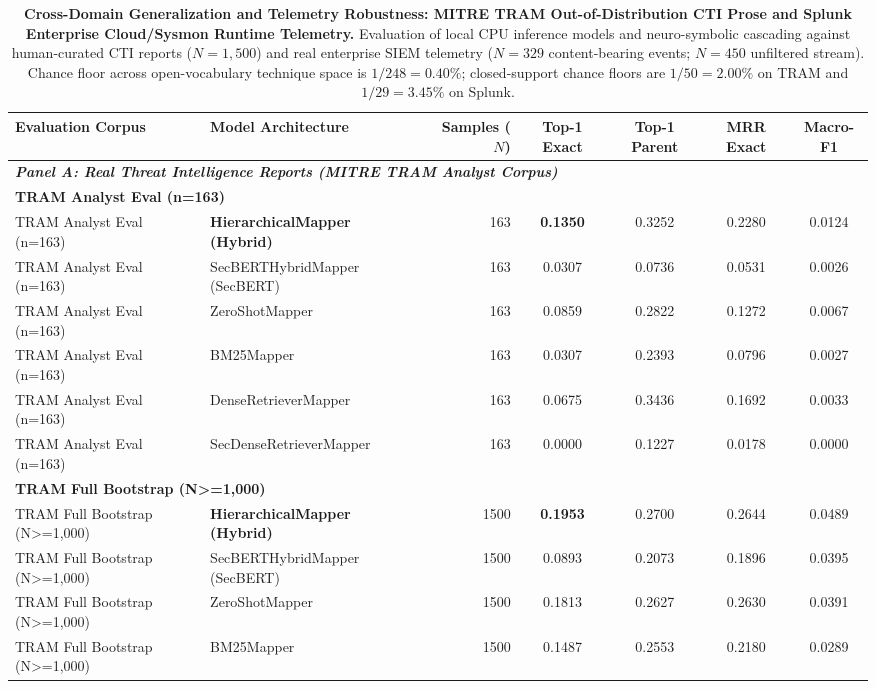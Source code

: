 \begin{table}[t]
\centering
\small
\caption{\textbf{Cross-Domain Generalization and Telemetry Robustness: MITRE TRAM Out-of-Distribution CTI Prose and Splunk Enterprise Cloud/Sysmon Runtime Telemetry.} Evaluation of local CPU inference models and neuro-symbolic cascading against human-curated CTI reports ($N=1,500$) and real enterprise SIEM telemetry ($N=329$ content-bearing events; $N=450$ unfiltered stream). Chance floor across open-vocabulary technique space is $1/248 = 0.40\%$; closed-support chance floors are $1/50 = 2.00\%$ on TRAM and $1/29 = 3.45\%$ on Splunk.}
\label{tab:external_validation}
\begin{tabular}{llrcccc}
\toprule
\textbf{Evaluation Corpus} & \textbf{Model Architecture} & \textbf{Samples ($N$)} & \textbf{Top-1 Exact} & \textbf{Top-1 Parent} & \textbf{MRR Exact} & \textbf{Macro-F1} \\
\midrule
\multicolumn{7}{l}{\textit{\textbf{Panel A: Real Threat Intelligence Reports (MITRE TRAM Analyst Corpus)}}} \\
\midrule
\multicolumn{7}{l}{\textbf{TRAM Analyst Eval (n=163)}} \\
TRAM Analyst Eval (n=163) & \textbf{HierarchicalMapper (Hybrid)} & 163 & \textbf{0.1350} & 0.3252 & 0.2280 & 0.0124 \\
TRAM Analyst Eval (n=163) & SecBERTHybridMapper (SecBERT) & 163 & 0.0307 & 0.0736 & 0.0531 & 0.0026 \\
TRAM Analyst Eval (n=163) & ZeroShotMapper & 163 & 0.0859 & 0.2822 & 0.1272 & 0.0067 \\
TRAM Analyst Eval (n=163) & BM25Mapper & 163 & 0.0307 & 0.2393 & 0.0796 & 0.0027 \\
TRAM Analyst Eval (n=163) & DenseRetrieverMapper & 163 & 0.0675 & 0.3436 & 0.1692 & 0.0033 \\
TRAM Analyst Eval (n=163) & SecDenseRetrieverMapper & 163 & 0.0000 & 0.1227 & 0.0178 & 0.0000 \\
\midrule
\multicolumn{7}{l}{\textbf{TRAM Full Bootstrap (N>=1,000)}} \\
TRAM Full Bootstrap (N>=1,000) & \textbf{HierarchicalMapper (Hybrid)} & 1500 & \textbf{0.1953} & 0.2700 & 0.2644 & 0.0489 \\
TRAM Full Bootstrap (N>=1,000) & SecBERTHybridMapper (SecBERT) & 1500 & 0.0893 & 0.2073 & 0.1896 & 0.0395 \\
TRAM Full Bootstrap (N>=1,000) & ZeroShotMapper & 1500 & 0.1813 & 0.2627 & 0.2630 & 0.0391 \\
TRAM Full Bootstrap (N>=1,000) & BM25Mapper & 1500 & 0.1487 & 0.2553 & 0.2180 & 0.0289 \\

\end{tabular}
\end{table}
